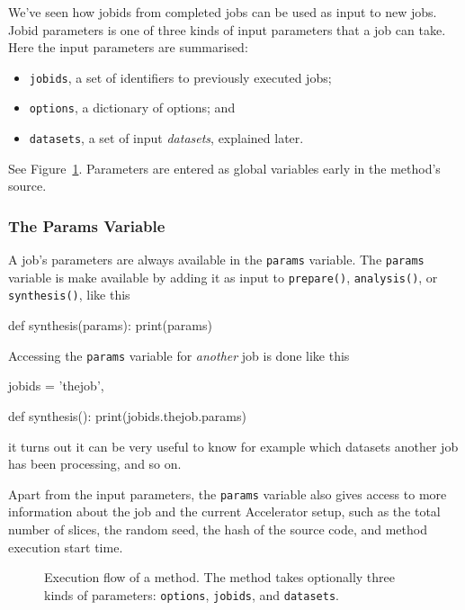 We've seen how jobids from completed jobs can be used as input to new
jobs.  Jobid parameters is one of three kinds of input parameters that
a job can take.  Here the input parameters are summarised:
\begin{itemize}
\item[] \texttt{jobids}, a set of identifiers to previously executed jobs;
\item[] \texttt{options}, a dictionary of options; and
\item[] \texttt{datasets}, a set of input \textsl{datasets}, explained later.
\end{itemize}
See Figure~\ref{fig:execflow}.  Parameters are entered as global
variables early in the method's source.



\subsubsection*{The Params Variable}
A job's parameters are always available in the \texttt{params}
variable.  The \texttt{params} variable is make available by adding it
as input to \texttt{prepare()}, \texttt{analysis()}, or
\texttt{synthesis()}, like this
\begin{python}
def synthesis(params):
    print(params)
\end{python}
Accessing the \texttt{params} variable for \textsl{another} job is
done like this
\begin{python}
jobids = {'thejob',}

def synthesis():
    print(jobids.thejob.params)
\end{python}
it turns out it can be very useful to know for example which datasets
another job has been processing, and so on.

Apart from the input parameters, the \texttt{params} variable also
gives access to more information about the job and the current
Accelerator setup, such as the total number of slices, the random
seed, the hash of the source code, and method execution start time.


\begin{figure}[h!]
  \begin{center}
    
    \caption{Execution flow of a method.  The method takes optionally
      three kinds of parameters: \texttt{options}, \texttt{jobids},
      and \texttt{datasets}.}
    \label{fig:execflow}
  \end{center}
\end{figure}


